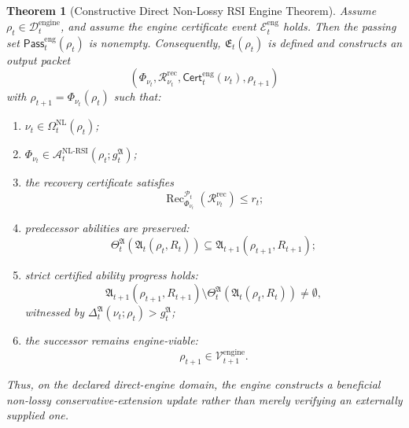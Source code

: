 \documentclass[11pt]{article}
\newtheorem{theorem}{Theorem}[section]
\newcommand{\Acal}{\mathcal{A}}
\newcommand{\Pcal}{\mathcal{P}}
\newcommand{\Ecal}{\mathcal{E}}
\newcommand{\Rcal}{\mathcal{R}}
\newcommand{\1}{\mathbf{1}}
\providecommand{\Dcal}{\mathcal{D}}
\providecommand{\Vcal}{\mathcal{V}}
\providecommand{\Rec}{\operatorname{Rec}}
\begin{document}
\begin{theorem}[Constructive Direct Non-Lossy RSI Engine Theorem]
\label{thm:constructive_direct_nl_rsi_engine}
Assume \(\rho_t\in\Dcal_t^{\mathrm{engine}}\), and assume the engine certificate event \(\Ecal_t^{\mathrm{eng}}\) holds.  Then the passing set \(\mathsf{Pass}_t^{\mathrm{eng}}(\rho_t)\) is nonempty.  Consequently, \(\mathfrak E_t(\rho_t)\) is defined and constructs an output packet
\[
(\Phi_{\nu_t},\Rcal_{\nu_t}^{\mathrm{rec}},\mathsf{Cert}_t^{\mathrm{eng}}(\nu_t),\rho_{t+1})
\]
with \(\rho_{t+1}=\Phi_{\nu_t}(\rho_t)\) such that:
\begin{enumerate}[label=(\roman*),leftmargin=1.5em]
    \item \(\nu_t\in\Omega_t^{\mathrm{NL}}(\rho_t)\);
    \item \(\Phi_{\nu_t}\in\Acal_t^{\mathrm{NL\mbox{-}RSI}}(\rho_t;g_t^{\mathfrak A})\);
    \item the recovery certificate satisfies
    \[
    \Rec_{\Phi_{\nu_t}}^{\Pcal_t}(\Rcal_{\nu_t}^{\mathrm{rec}})\le r_t;
    \]
    \item predecessor abilities are preserved:
    \[
    \Theta_t^{\mathfrak A}(\mathfrak A_t(\rho_t,R_t))
    \subseteq
    \mathfrak A_{t+1}(\rho_{t+1},R_{t+1});
    \]
    \item strict certified ability progress holds:
    \[
    \mathfrak A_{t+1}(\rho_{t+1},R_{t+1})
    \setminus
    \Theta_t^{\mathfrak A}(\mathfrak A_t(\rho_t,R_t))
    \ne\emptyset,
    \]
    witnessed by \(\Delta_t^{\mathfrak A}(\nu_t;\rho_t)>g_t^{\mathfrak A}\);
    \item the successor remains engine-viable:
    \[
    \rho_{t+1}\in\Vcal_{t+1}^{\mathrm{engine}}.
    \]
\end{enumerate}
Thus, on the declared direct-engine domain, the engine constructs a beneficial non-lossy conservative-extension update rather than merely verifying an externally supplied one.
\end{theorem}
\end{document}
